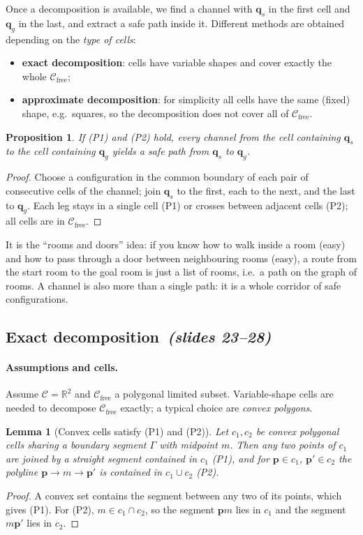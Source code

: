 \documentclass[11pt,a4paper]{article}
\newcommand{\Cspace}{\mathcal{C}}
\newcommand{\Cfree}{\mathcal{C}_{\mathrm{free}}}
\newcommand{\R}{\mathbb{R}}
\newcommand{\qs}{\boldsymbol{q}_s}
\newcommand{\qg}{\boldsymbol{q}_g}
\newcommand{\slides}[1]{\emph{(slides #1)}}
\newcommand{\subsect}[2]{\subsection{#1\texorpdfstring{\ \slides{#2}}{ (slides #2)}}}
\theoremstyle{definition}
\theoremstyle{plain}
\newtheorem{lemma}[definition]{Lemma}
\newtheorem{proposition}[definition]{Proposition}
\theoremstyle{remark}
\begin{document}
Once a decomposition is available, we find a channel with $\qs$ in the first cell and $\qg$ in the last, and extract a safe path inside it. Different methods are obtained depending on the \emph{type of cells}:
\begin{itemize}
  \item \textbf{exact decomposition}: cells have variable shapes and cover exactly the whole $\Cfree$;
  \item \textbf{approximate decomposition}: for simplicity all cells have the same (fixed) shape, e.g.\ squares, so the decomposition does not cover all of $\Cfree$.
\end{itemize}

\begin{proposition}
\label{prop:channel}
If (P1) and (P2) hold, every channel from the cell containing $\qs$ to the cell containing $\qg$ yields a safe path from $\qs$ to $\qg$.
\end{proposition}
\begin{proof}
Choose a configuration in the common boundary of each pair of consecutive cells of the channel; join $\qs$ to the first, each to the next, and the last to $\qg$. Each leg stays in a single cell (P1) or crosses between adjacent cells (P2); all cells are in $\Cfree$.
\end{proof}

\begin{intuition}
It is the ``rooms and doors'' idea: if you know how to walk inside a room (easy) and how to pass through a door between neighbouring rooms (easy), a route from the start room to the goal room is just a list of rooms, i.e.\ a path on the graph of rooms. A channel is also more than a single path: it is a whole corridor of safe configurations.
\end{intuition}

\subsect{Exact decomposition}{23--28}

\paragraph{Assumptions and cells.} Assume $\Cspace=\R^2$ and $\Cfree$ a polygonal limited subset. Variable-shape cells are needed to decompose $\Cfree$ exactly; a typical choice are \emph{convex polygons}.

\begin{lemma}[Convex cells satisfy (P1) and (P2)]
\label{lem:convex}
Let $c_1,c_2$ be convex polygonal cells sharing a boundary segment $\Gamma$ with midpoint $m$. Then any two points of $c_1$ are joined by a straight segment contained in $c_1$ (P1), and for $\boldsymbol p\in c_1$, $\boldsymbol p'\in c_2$ the polyline $\boldsymbol p\to m\to\boldsymbol p'$ is contained in $c_1\cup c_2$ (P2).
\end{lemma}
\begin{proof}
A convex set contains the segment between any two of its points, which gives (P1). For (P2), $m\in c_1\cap c_2$, so the segment $\boldsymbol p m$ lies in $c_1$ and the segment $m\boldsymbol p'$ lies in $c_2$.
\end{proof}
\end{document}
